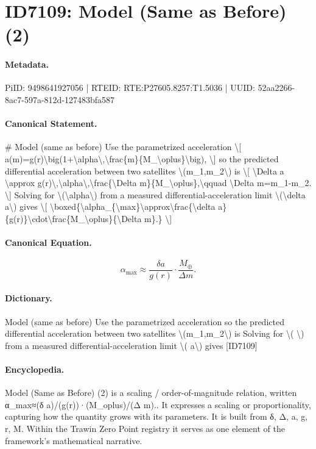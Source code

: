 \section*{ID7109: Model (Same as Before) (2)}
\paragraph{Metadata.}
PiID: 9498641927056 | RTEID: RTE:P27605.8257:T1.5036 | UUID: 52aa2266-8ac7-597a-812d-127483bfa587

\paragraph{Canonical Statement.}
\# Model (same as before) Use the parametrized acceleration \textbackslash{}[ a(m)=g(r)\textbackslash{}big(1+\textbackslash{}alpha\textbackslash{},\textbackslash{}frac\{m\}\{M\_\textbackslash{}oplus\}\textbackslash{}big), \textbackslash{}] so the predicted differential acceleration between two satellites \textbackslash{}(m\_1,m\_2\textbackslash{}) is \textbackslash{}[ \textbackslash{}Delta a \textbackslash{}approx g(r)\textbackslash{},\textbackslash{}alpha\textbackslash{},\textbackslash{}frac\{\textbackslash{}Delta m\}\{M\_\textbackslash{}oplus\},\textbackslash{}qquad \textbackslash{}Delta m=m\_1-m\_2. \textbackslash{}] Solving for \textbackslash{}(\textbackslash{}alpha\textbackslash{}) from a measured differential-acceleration limit \textbackslash{}(\textbackslash{}delta a\textbackslash{}) gives \textbackslash{}[ \textbackslash{}boxed\{\textbackslash{}alpha\_\{\textbackslash{}max\}\textbackslash{}approx\textbackslash{}frac\{\textbackslash{}delta a\}\{g(r)\}\textbackslash{}cdot\textbackslash{}frac\{M\_\textbackslash{}oplus\}\{\textbackslash{}Delta m\}.\} \textbackslash{}]

\paragraph{Canonical Equation.}
\[
\boxed{\alpha_{\max}\approx\frac{\delta a}{g(r)}\cdot\frac{M_\oplus}{\Delta m}.}
\]

\paragraph{Dictionary.}
Model (same as before) Use the parametrized acceleration so the predicted differential acceleration between two satellites \textbackslash{}(m\_1,m\_2\textbackslash{}) is Solving for \textbackslash{}( \textbackslash{}) from a measured differential-acceleration limit \textbackslash{}( a\textbackslash{}) gives [ID7109]

\paragraph{Encyclopedia.}
Model (Same as Before) (2) is a scaling / order-of-magnitude relation, written α\_max≈(δ a)/(g(r))·(M\_oplus)/(Δ m).. It expresses a scaling or proportionality, capturing how the quantity grows with its parameters. It is built from δ, Δ, a, g, r, M. Within the Trawin Zero Point registry it serves as one element of the framework's mathematical narrative.
